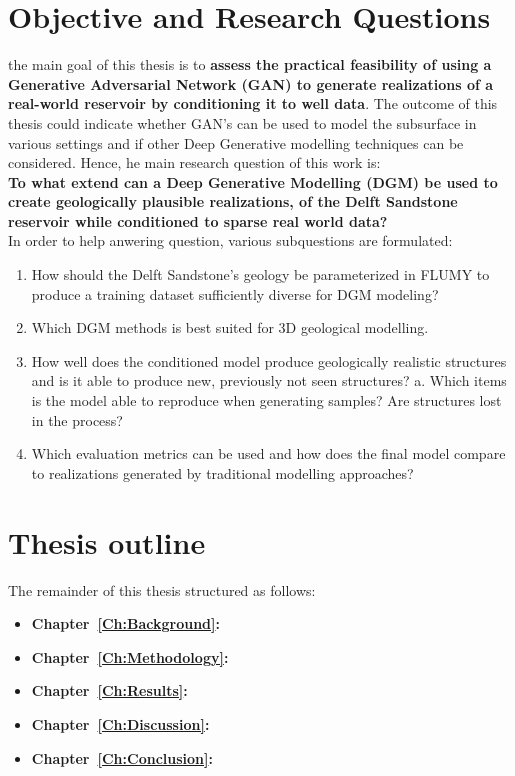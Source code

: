 \section{Objective and Research Questions}
the main goal of this thesis is to \textbf{assess the practical feasibility of using a Generative Adversarial Network (GAN) to generate realizations of a real-world reservoir by conditioning it to well data}. The outcome of this thesis could indicate whether GAN's can be used to model the subsurface in various settings and if other Deep Generative modelling techniques can be considered. Hence, he main research question of this work is:\\
\textbf{To what extend can a Deep Generative Modelling (DGM) be used to create geologically plausible realizations, of the Delft Sandstone reservoir while conditioned to sparse real world data?}\\
In order to help anwering question, various subquestions are formulated:
\begin{enumerate}
    \item How should the Delft Sandstone’s geology be parameterized in FLUMY to produce a training dataset sufficiently diverse for DGM modeling?
    \item  Which DGM methods is best suited for 3D geological modelling. 
    \item How well does the conditioned model produce geologically realistic structures and is it able to produce new, previously not seen structures? 
    \subitem a. Which items is the model able to reproduce when generating samples? Are structures lost in the process?
    \item Which evaluation metrics can be used and how does the final model compare to realizations generated by traditional modelling approaches?
\end{enumerate}
\section{Thesis outline}
The remainder of this thesis structured as follows:
\begin{itemize}
    \item \textbf{Chapter~\ref{Ch:Background}:}
    \item \textbf{Chapter~\ref{Ch:Methodology}:}
    \item \textbf{Chapter~\ref{Ch:Results}:}
    \item \textbf{Chapter~\ref{Ch:Discussion}:}
    \item \textbf{Chapter~\ref{Ch:Conclusion}:}
\end{itemize}
